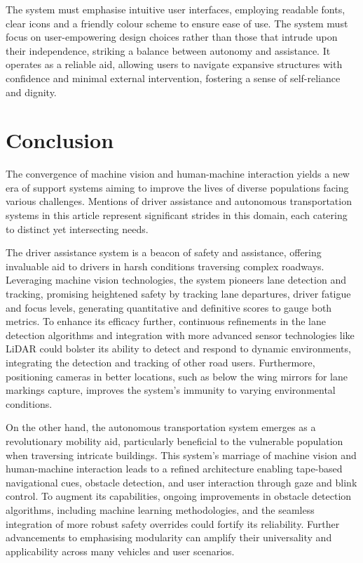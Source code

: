 \documentclass[9pt,conference]{IEEEtran}
\begin{document}
The system must emphasise intuitive user interfaces, employing readable fonts, clear icons and a friendly colour scheme to ensure ease of use. The system must focus on user-empowering design choices rather than those that intrude upon their independence, striking a balance between autonomy and assistance. It operates as a reliable aid, allowing users to navigate expansive structures with confidence and minimal external intervention, fostering a sense of self-reliance and dignity.

\section{Conclusion}

The convergence of machine vision and human-machine interaction yields a new era of support systems aiming to improve the lives of diverse populations facing various challenges. Mentions of driver assistance and autonomous transportation systems in this article represent significant strides in this domain, each catering to distinct yet intersecting needs.

The driver assistance system is a beacon of safety and assistance, offering invaluable aid to drivers in harsh conditions traversing complex roadways. Leveraging machine vision technologies, the system pioneers lane detection and tracking, promising heightened safety by tracking lane departures, driver fatigue and focus levels, generating quantitative and definitive scores to gauge both metrics. To enhance its efficacy further, continuous refinements in the lane detection algorithms and integration with more advanced sensor technologies like LiDAR could bolster its ability to detect and respond to dynamic environments, integrating the detection and tracking of other road users. Furthermore, positioning cameras in better locations, such as below the wing mirrors for lane markings capture, improves the system's immunity to varying environmental conditions.

On the other hand, the autonomous transportation system emerges as a revolutionary mobility aid, particularly beneficial to the vulnerable population when traversing intricate buildings. This system's marriage of machine vision and human-machine interaction leads to a refined architecture enabling tape-based navigational cues, obstacle detection, and user interaction through gaze and blink control. To augment its capabilities, ongoing improvements in obstacle detection algorithms, including machine learning methodologies, and the seamless integration of more robust safety overrides could fortify its reliability. Further advancements to emphasising modularity can amplify their universality and applicability across many vehicles and user scenarios.
\end{document}
